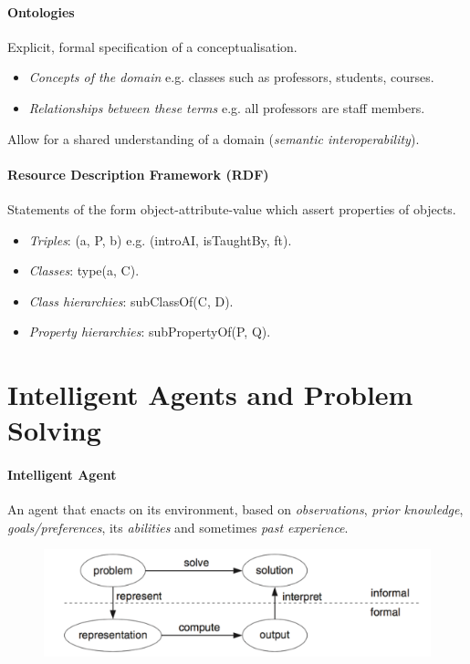 \documentclass[twocolumn,english]{article}
\begin{document}
\paragraph{Ontologies}

Explicit, formal specification of a conceptualisation.
\begin{itemize}
\item \emph{Concepts of the domain} e.g. classes such as professors, students,
courses.
\item \emph{Relationships between these terms} e.g. all professors are staff
members.
\end{itemize}
Allow for a shared understanding of a domain (\emph{semantic interoperability}).

\paragraph{Resource Description Framework (RDF)}

Statements of the form object-attribute-value which assert properties
of objects.
\begin{itemize}
\item \emph{Triples}: (a, P, b) e.g. (introAI, isTaughtBy, ft).
\item \emph{Classes}: type(a, C).
\item \emph{Class hierarchies}: subClassOf(C, D).
\item \emph{Property hierarchies}: subPropertyOf(P, Q).
\end{itemize}

\section{Intelligent Agents and Problem Solving}

\paragraph{Intelligent Agent}

An agent that enacts on its environment, based on \emph{observations},
\emph{prior knowledge}, \emph{goals/preferences}, its \emph{abilities}
and sometimes \emph{past experience}.

\begin{figure}[H]
\centering{}\includegraphics[width=0.6\columnwidth]{img/representation}
\end{figure}
\end{document}
